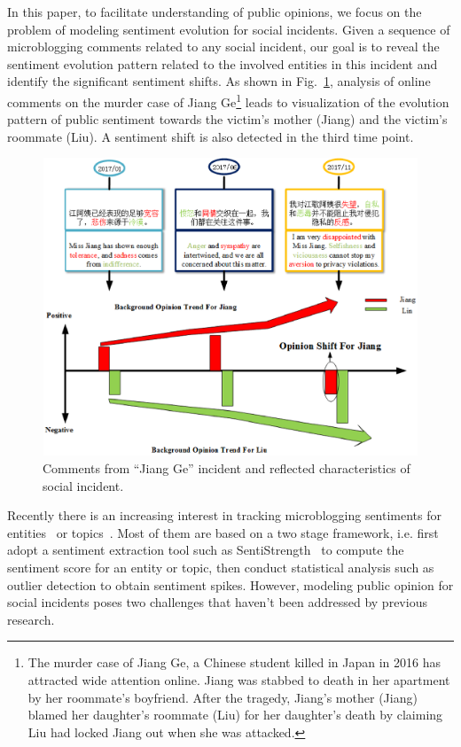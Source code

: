 \documentclass[runningheads]{llncs}
\begin{document}
In this paper, to facilitate understanding of public opinions, we focus on the problem of modeling sentiment evolution for social incidents. 
Given a sequence of microblogging comments related to any social incident, our goal is to reveal the sentiment evolution pattern related to the involved entities in this incident and identify the significant sentiment shifts. 
As shown in Fig.~\ref{fig:tweet}, analysis of online comments on the murder case of Jiang Ge\footnote{The murder case of Jiang Ge, a Chinese student killed in Japan in 2016 has attracted wide attention online. Jiang was stabbed to death in her apartment by her roommate's boyfriend. After the tragedy, Jiang's mother (Jiang) blamed her daughter's roommate (Liu) for her daughter's death by claiming Liu had locked Jiang out when she was attacked.} leads to visualization of the evolution pattern of public sentiment towards the victim's mother (Jiang) and the victim's roommate (Liu). A sentiment shift is also detected in the third time point. %

\begin{figure}
    \centering
    \includegraphics[width=1.0\textwidth,height=3.5in]{tweet.eps}
    \setlength{\abovecaptionskip}{-0.1cm}
    \caption{Comments from ``Jiang Ge'' incident and reflected characteristics of social incident.}\label{fig:tweet}
\end{figure}

Recently there is an increasing interest in tracking microblogging sentiments for entities~\cite{Giachanou2016sentichange,Giachanou2017sentichange} or topics~\cite{Tsytsarau2014Topics,Thelwall2011topic}. Most of them are based on a two stage framework, i.e. first adopt a sentiment extraction tool such as SentiStrength~\cite{sentistrength2010} to compute the sentiment score for an entity or topic, then conduct statistical analysis such as outlier detection to obtain sentiment spikes. However, modeling public opinion for social incidents poses two challenges that haven't been addressed by previous research.
\end{document}
